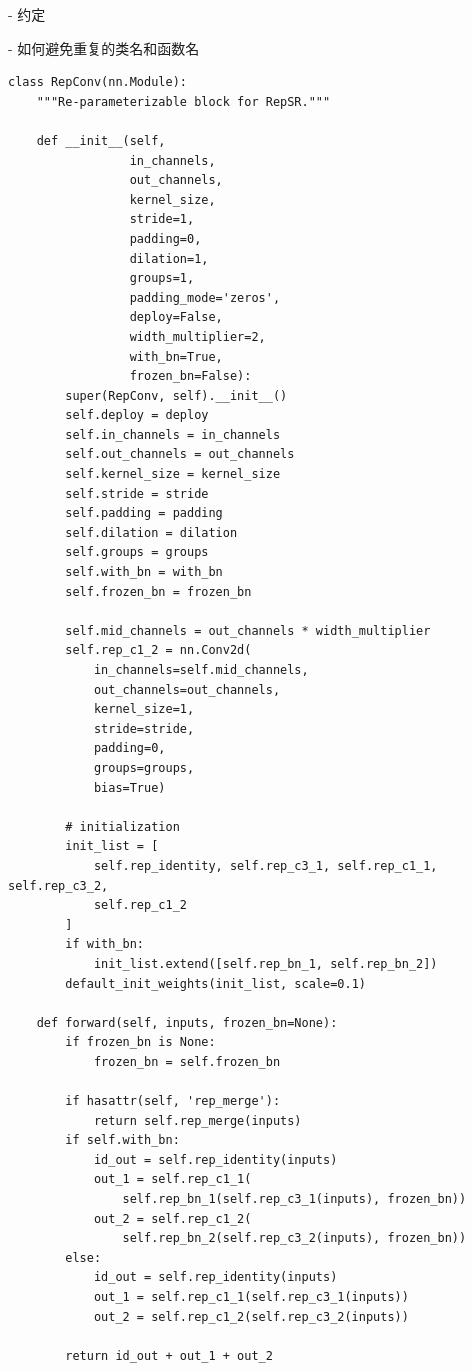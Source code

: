 \documentclass[../main.tex]{subfiles}
\begin{document}
- 约定

- 如何避免重复的类名和函数名

\begin{verbatim}
class RepConv(nn.Module):
    """Re-parameterizable block for RepSR."""

    def __init__(self,
                 in_channels,
                 out_channels,
                 kernel_size,
                 stride=1,
                 padding=0,
                 dilation=1,
                 groups=1,
                 padding_mode='zeros',
                 deploy=False,
                 width_multiplier=2,
                 with_bn=True,
                 frozen_bn=False):
        super(RepConv, self).__init__()
        self.deploy = deploy
        self.in_channels = in_channels
        self.out_channels = out_channels
        self.kernel_size = kernel_size
        self.stride = stride
        self.padding = padding
        self.dilation = dilation
        self.groups = groups
        self.with_bn = with_bn
        self.frozen_bn = frozen_bn

        self.mid_channels = out_channels * width_multiplier
        self.rep_c1_2 = nn.Conv2d(
            in_channels=self.mid_channels,
            out_channels=out_channels,
            kernel_size=1,
            stride=stride,
            padding=0,
            groups=groups,
            bias=True)

        # initialization
        init_list = [
            self.rep_identity, self.rep_c3_1, self.rep_c1_1, self.rep_c3_2,
            self.rep_c1_2
        ]
        if with_bn:
            init_list.extend([self.rep_bn_1, self.rep_bn_2])
        default_init_weights(init_list, scale=0.1)

    def forward(self, inputs, frozen_bn=None):
        if frozen_bn is None:
            frozen_bn = self.frozen_bn

        if hasattr(self, 'rep_merge'):
            return self.rep_merge(inputs)
        if self.with_bn:
            id_out = self.rep_identity(inputs)
            out_1 = self.rep_c1_1(
                self.rep_bn_1(self.rep_c3_1(inputs), frozen_bn))
            out_2 = self.rep_c1_2(
                self.rep_bn_2(self.rep_c3_2(inputs), frozen_bn))
        else:
            id_out = self.rep_identity(inputs)
            out_1 = self.rep_c1_1(self.rep_c3_1(inputs))
            out_2 = self.rep_c1_2(self.rep_c3_2(inputs))

        return id_out + out_1 + out_2
\end{verbatim}
\end{document}
